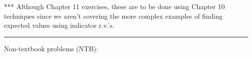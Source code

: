 \documentclass[12pt]{article}
\begin{document}
*** Although Chapter 11 exercises, these are to be done using Chapter 10 techniques since we aren't covering the more complex examples of finding expected values using indicator r.v.'s. 


%






\rule{500pt}{1pt}
\bigskip


 Non-textbook problems (NTB):          \label{NTB}
\end{document}
